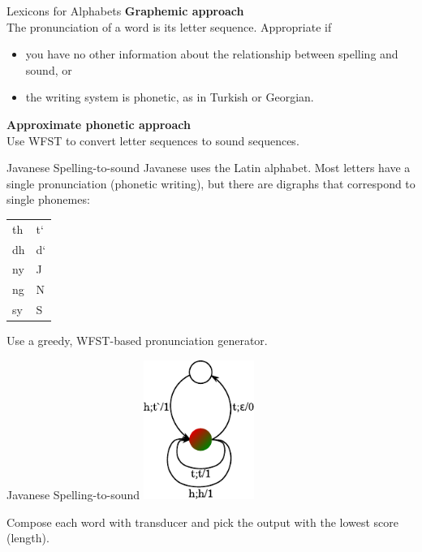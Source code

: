 \begin{frame}{Lexicons for Alphabets}{}
  {\color{DarkerBlue}\bf Graphemic approach} \\
  The pronunciation of a word is its letter sequence.  Appropriate if
  \begin{itemize}
  \item you have no other information about the relationship between
    spelling and sound, or
  \item the writing system is phonetic, as in Turkish or Georgian.
  \end{itemize}
  \vfill
  {\color{DarkerBlue}\bf Approximate phonetic approach} \\
  Use WFST to convert letter sequences to sound sequences.      
\end{frame}

\begin{frame}{Javanese Spelling-to-sound}{}
  Javanese uses the Latin alphabet.  Most letters have a single
  pronunciation (phonetic writing), but there are digraphs that
  correspond to single phonemes:
  \vfill
  \centering
  \begin{tabular}{@{}l@{$\rightarrow$}l@{}}
    th & t` \\
    dh & d` \\
    ny & J  \\
    ng & N  \\
    sy & S  \\
  \end{tabular}
  \vfill
  \raggedright
  Use a greedy, WFST-based pronunciation generator.
\end{frame}

\begin{frame}{Javanese Spelling-to-sound}{}
  \centering
  \includegraphics[width=36mm]{figures/Javanese}
  \vfill
  \raggedright
  Compose each word with transducer and pick the output with the
  lowest score (length).
  \vfill
\end{frame}

